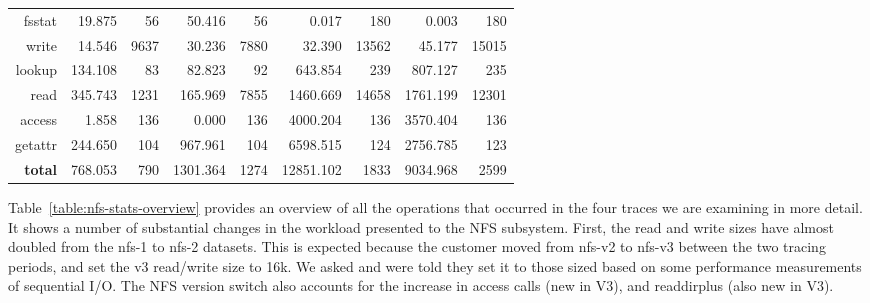 \begin{table*}
\begin{tabular}{|r||r|r||r|r||r|r||r|r|}
      fsstat &    19.875 &    56 &    50.416 &    56 &     0.017 &   180 &     0.003 &   180 \\
       write &    14.546 &  9637 &    30.236 &  7880 &    32.390 & 13562 &    45.177 & 15015 \\
\hline
      lookup &   134.108 &    83 &    82.823 &    92 &   643.854 &   239 &   807.127 &   235 \\
        read &   345.743 &  1231 &   165.969 &  7855 &  1460.669 & 14658 &  1761.199 & 12301 \\
      access &     1.858 &   136 &     0.000 &   136 &  4000.204 &   136 &  3570.404 &   136 \\
     getattr &   244.650 &   104 &   967.961 &   104 &  6598.515 &   124 &  2756.785 &   123 \\
\hline
 {\bf total} &   768.053 &   790 &  1301.364 &  1274 & 12851.102 &  1833 &  9034.968 &  2599 \\
\hline
\end{tabular}

\caption{symlink, rmdir, mkdir, and rename were pruned as there were
fewer than 1 million operations; fsinfo, link, null, create, remove,
and setattr were pruned as there were fewer than 10 million
operations}

\label{table:nfs-stats-overview}
\end{table*}

\begin{figure*}
\caption{Operation rates, grouped into one hour units (a), and quantiles (b), (c).}
\label{fig:oprates}
\end{figure*}

\begin{figure*}
\caption{Bandwidth for reads and writes, and operation rate for getattrs in the four traces.}
\label{fig:bw-ops-quantiles}
\end{figure*}

Table~\ref{table:nfs-stats-overview} provides an overview of all the
operations that occurred in the four traces we are examining in more
detail.  It shows a number of substantial changes in the workload
presented to the NFS subsystem.  First, the read and write sizes have
almost doubled from the nfs-1 to nfs-2 datasets.  This is expected
because the customer moved from nfs-v2 to nfs-v3 between the two
tracing periods, and set the v3 read/write size to 16k.  We asked and
were told they set it to those sized based on some performance
measurements of sequential I/O.  The NFS version switch also accounts
for the increase in access calls (new in V3), and readdirplus (also
new in V3).  

